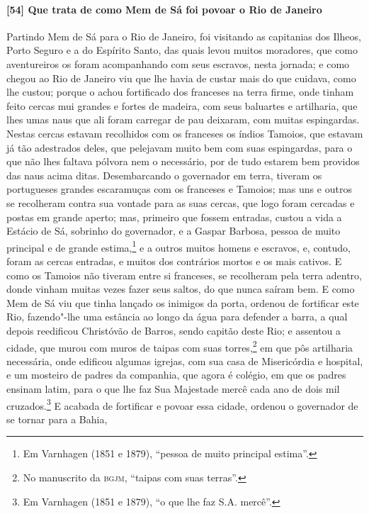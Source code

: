 \paragraph{[54] Que trata de como Mem de Sá foi povoar o Rio de Janeiro} \quad
Partindo Mem de Sá para o Rio de Janeiro, foi visitando as capitanias dos Ilheos, Porto
Seguro e a do Espírito Santo, das quais levou muitos moradores, que como aventureiros os
foram acompanhando com seus escravos, nesta jornada; e como chegou ao Rio de Janeiro viu
que lhe havia de custar mais do que cuidava, como lhe custou; porque o achou fortificado
dos franceses na terra firme, onde tinham feito cercas mui grandes e fortes de madeira,
com seus baluartes e artilharia, que lhes umas naus que ali foram carregar de pau
deixaram, com muitas espingardas. Nestas cercas estavam recolhidos com os franceses os
índios Tamoios, que estavam já tão adestrados deles, que pelejavam muito bem com suas
espingardas, para o que não lhes faltava pólvora nem o necessário, por de tudo estarem bem
providos das naus acima ditas. Desembarcando o governador em terra, tiveram os portugueses
grandes escaramuças com os franceses e Tamoios; mas uns e outros se recolheram contra sua
vontade para as suas cercas, que logo foram cercadas e postas em grande aperto; mas,
primeiro que fossem entradas, custou a vida a Estácio de Sá, sobrinho do governador, e a
Gaspar Barbosa, pessoa de muito principal e de grande estima,\footnote{ Em Varnhagen (1851
e 1879), ``pessoa de muito principal estima''.} e a outros muitos homens e escravos, e,
contudo, foram as cercas entradas, e muitos dos contrários mortos e os mais cativos. E
como os Tamoios não tiveram entre si franceses, se recolheram pela terra adentro, donde
vinham muitas vezes fazer seus saltos, do que nunca saíram bem. E como Mem de Sá viu que
tinha lançado os inimigos da porta, ordenou de fortificar este Rio, fazendo"-lhe uma
estância ao longo da água para defender a barra, a qual depois reedificou Christóvão de
Barros, sendo capitão deste Rio; e assentou a cidade, que murou com muros de taipas com
suas torres,\footnote{ No manuscrito da \textsc{bgjm}, ``taipas com suas terras''.} em que
pôs artilharia necessária, onde edificou algumas igrejas, com sua casa de Misericórdia e
hospital, e um mosteiro de padres da companhia, que agora é colégio, em que os padres
ensinam latim, para o que lhe faz Sua Majestade mercê cada ano de dois mil
cruzados.\footnote{ Em Varnhagen (1851 e 1879), ``o que lhe faz S.A. mercê''.} E acabada
de fortificar e povoar essa cidade, ordenou o governador de se tornar para a Bahia,
